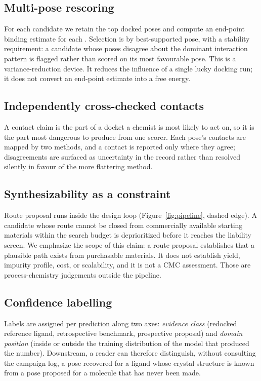 \documentclass[10pt,twocolumn]{article}
\begin{document}
\subsection{Multi-pose rescoring}
\label{sec:rescore}

For each candidate we retain the top docked poses and compute an end-point
binding estimate for each \citep{genheden2015mmpbsa}. Selection is by
best-supported pose, with a stability requirement: a candidate whose poses
disagree about the dominant interaction pattern is flagged rather than scored
on its most favourable pose. This is a variance-reduction device. It reduces
the influence of a single lucky docking run; it does not convert an end-point
estimate into a free energy.

\subsection{Independently cross-checked contacts}
\label{sec:contacts}

A contact claim is the part of a docket a chemist is most likely to act on, so
it is the part most dangerous to produce from one scorer. Each pose's contacts
are mapped by two methods, and a contact is reported only where they agree;
disagreements are surfaced as uncertainty in the record rather than resolved
silently in favour of the more flattering method.

\subsection{Synthesizability as a constraint}
\label{sec:synth}

Route proposal runs inside the design loop (Figure~\ref{fig:pipeline}, dashed
edge). A candidate whose route cannot be closed from commercially available
starting materials within the search budget is deprioritized before it reaches
the liability screen. We emphasize the scope of this claim: a route proposal
establishes that a plausible path exists from purchasable materials. It does
not establish yield, impurity profile, cost, or scalability, and it is not a
CMC assessment. Those are process-chemistry judgements outside the pipeline.

\subsection{Confidence labelling}
\label{sec:confidence}

Labels are assigned per prediction along two axes: \emph{evidence class}
(redocked reference ligand, retrospective benchmark, prospective proposal) and
\emph{domain position} (inside or outside the training distribution of the
model that produced the number). Downstream, a reader can therefore
distinguish, without consulting the campaign log, a pose recovered for a ligand
whose crystal structure is known from a pose proposed for a molecule that has
never been made.
\end{document}
